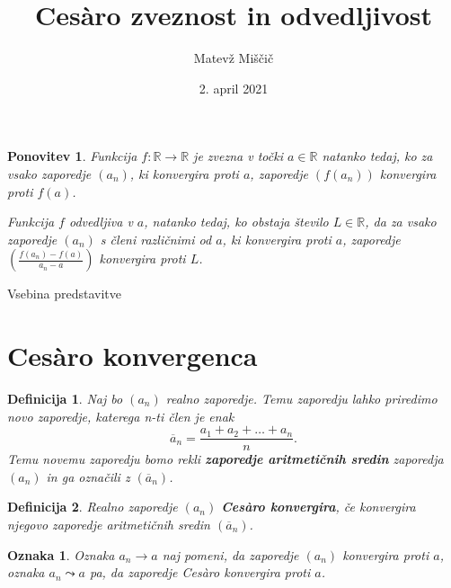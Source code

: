 \documentclass[10pt,hyperref={unicode}]{beamer}
\title{Ces\`{a}ro zveznost in odvedljivost}
\author{Matevž Miščič}
\date{2. april 2021}
\newtheorem{definicija}{Definicija}
\newtheorem{ponovitev}{Ponovitev}
\newtheorem{oznaka}{Oznaka}
\begin{document}
    
\begin{frame}
    \titlepage
\end{frame}

\begin{frame}
    \begin{ponovitev}
        Funkcija $f: \mathbb{R} \rightarrow \mathbb{R}$ je zvezna v točki $a \in \mathbb{R}$ natanko tedaj, ko za vsako zaporedje $(a_n)$, ki konvergira proti $a$, zaporedje $(f(a_n))$ konvergira proti $f(a)$.
        \pause
        
        \medskip
        Funkcija $f$ odvedljiva v $a$, natanko tedaj, ko obstaja število $L \in \mathbb{R}$, da za vsako zaporedje $(a_n)$ s členi različnimi od $a$, ki konvergira proti $a$, zaporedje $\left(\frac{f(a_n)-f(a)}{a_n-a}\right)$ konvergira proti $L$.
    \end{ponovitev}
\end{frame}

\begin{frame}{Vsebina predstavitve}
    \tableofcontents
\end{frame}



\section{Ces\`{a}ro konvergenca}

\begin{frame}
    \begin{definicija}
        Naj bo $(a_n)$ realno zaporedje. Temu zaporedju lahko priredimo novo zaporedje, katerega n-ti člen je enak 
        $$\overline{a}_n = \frac{a_1+a_2+\ldots+a_n}{n}.$$ 
        Temu novemu zaporedju bomo rekli \textbf{zaporedje aritmetičnih sredin} zaporedja $(a_n)$ in ga označili z $(\overline{a}_n)$.
    \end{definicija}
    \pause
    \begin{definicija}
        Realno zaporedje $(a_n)$ \textbf{Ces\`{a}ro konvergira}, če konvergira njegovo zaporedje aritmetičnih sredin $(\overline{a}_n)$.
    \end{definicija}
    \pause
    \begin{oznaka}
        Oznaka $a_n \rightarrow a$ naj pomeni, da zaporedje $(a_n)$ konvergira proti $a$, oznaka $a_n \leadsto a$ pa, da zaporedje Ces\`{a}ro konvergira proti $a$. 
    \end{oznaka}
\end{frame}
\end{document}
